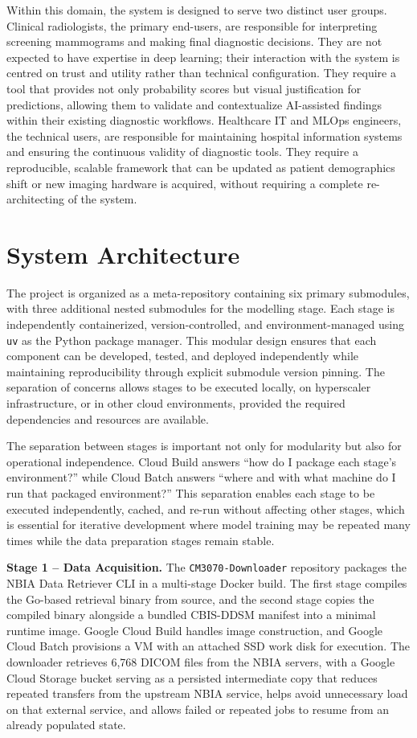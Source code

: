 \documentclass[justified,notoc,openany]{tufte-book}
\begin{document}
Within this domain, the system is designed to serve two distinct user groups. Clinical radiologists, the primary end-users, are responsible for interpreting screening mammograms and making final diagnostic decisions. They are not expected to have expertise in deep learning; their interaction with the system is centred on trust and utility rather than technical configuration. They require a tool that provides not only probability scores but visual justification for predictions, allowing them to validate and contextualize AI-assisted findings within their existing diagnostic workflows. Healthcare IT and MLOps engineers, the technical users, are responsible for maintaining hospital information systems and ensuring the continuous validity of diagnostic tools. They require a reproducible, scalable framework that can be updated as patient demographics shift or new imaging hardware is acquired, without requiring a complete re-architecting of the system.

\section{System Architecture}\label{system-architecture}

The project is organized as a meta-repository containing six primary submodules, with three additional nested submodules for the modelling stage. Each stage is independently containerized, version-controlled, and environment-managed using \texttt{uv} as the Python package manager. This modular design ensures that each component can be developed, tested, and deployed independently while maintaining reproducibility through explicit submodule version pinning. The separation of concerns allows stages to be executed locally, on hyperscaler infrastructure, or in other cloud environments, provided the required dependencies and resources are available.

The separation between stages is important not only for modularity but also for operational independence. Cloud Build answers ``how do I package each stage's environment?'' while Cloud Batch answers ``where and with what machine do I run that packaged environment?'' This separation enables each stage to be executed independently, cached, and re-run without affecting other stages, which is essential for iterative development where model training may be repeated many times while the data preparation stages remain stable.

\textbf{Stage 1 -- Data Acquisition.} The \texttt{CM3070-Downloader} repository packages the NBIA Data Retriever CLI in a multi-stage Docker build. The first stage compiles the Go-based retrieval binary from source, and the second stage copies the compiled binary alongside a bundled CBIS-DDSM manifest into a minimal runtime image. Google Cloud Build handles image construction, and Google Cloud Batch provisions a VM with an attached SSD work disk for execution. The downloader retrieves 6,768 DICOM files from the NBIA servers, with a Google Cloud Storage bucket serving as a persisted intermediate copy that reduces repeated transfers from the upstream NBIA service, helps avoid unnecessary load on that external service, and allows failed or repeated jobs to resume from an already populated state.
\end{document}
